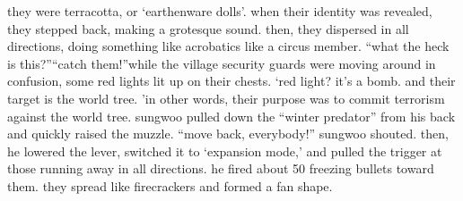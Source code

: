  they were terracotta, or ‘earthenware dolls’.
when their identity was revealed, they stepped back, making a grotesque sound.
 then, they dispersed in all directions, doing something like acrobatics like a circus member.
“what the heck is this?”“catch them!”while the village security guards were moving around in confusion, some red lights lit up on their chests.
‘red light? it’s a bomb.
 and their target is the world tree.
’in other words, their purpose was to commit terrorism against the world tree.
 sungwoo pulled down the “winter predator” from his back and quickly raised the muzzle.
“move back, everybody!” sungwoo shouted.
then, he lowered the lever, switched it to ‘expansion mode,’ and pulled the trigger at those running away in all directions.
he fired about 50 freezing bullets toward them.
 they spread like firecrackers and formed a fan shape.

